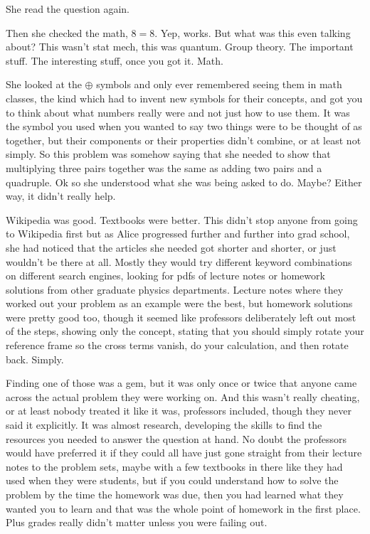 \mypause 

She read the question again. 

\mypause
%

Then she checked the math, $8=8$. Yep, works. But what was this even talking about? This wasn't stat mech, this was quantum. Group theory. The important stuff. The interesting stuff, once you got it. Math. 

She looked at the $\oplus$ symbols and only ever remembered seeing them in math classes, the kind which had to invent new symbols for their concepts, and got you to think about what numbers really were and not just how to use them. It was the symbol you used when you wanted to say two things were to be thought of as together, but their components or their properties didn't combine, or at least not simply. So this problem was somehow saying that she needed to show that multiplying three pairs together was the same as adding two pairs and a quadruple. Ok so she understood what she was being asked to do. Maybe? Either way, it didn't really help.

Wikipedia was good. Textbooks were better. This didn't stop anyone from going to Wikipedia first but as Alice progressed further and further into grad school, she had noticed that the articles she needed got shorter and shorter, or just wouldn't be there at all. Mostly they would try different keyword combinations on different search engines, looking for pdfs of lecture notes or homework solutions from other graduate physics departments. Lecture notes where they worked out your problem as an example were the best, but homework solutions were pretty good too, though it seemed like professors deliberately left out most of the steps, showing only the concept, stating that you should simply rotate your reference frame so the cross terms vanish, do your calculation, and then rotate back. Simply.

Finding one of those was a gem, but it was only once or twice that anyone came across the actual problem they were working on. And this wasn't really cheating, or at least nobody treated it like it was, professors included, though they never said it explicitly. It was almost research, developing the skills to find the resources you needed to answer the question at hand. No doubt the professors would have preferred it if they could all have just gone straight from their lecture notes to the problem sets, maybe with a few textbooks in there like they had used when they were students, but if you could understand how to solve the problem by the time the homework was due, then you had learned what they wanted you to learn and that was the whole point of homework in the first place. Plus grades really didn't matter unless you were failing out.

